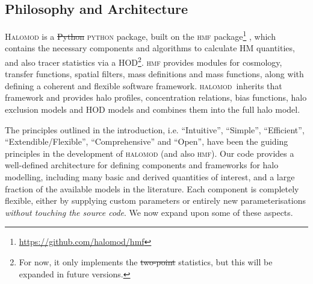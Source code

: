 \documentclass[5p,aas_macros]{elsarticle}
\newcommand{\halomod}{\textsc{halomod}\xspace} %
\newcommand{\python}{\textsc{python}\xspace} %
\newcommand{\bd}[1]{\textcolor{purple}{\textbf{[BD: #1]}}}
\newcommand{\sgm}[1]{\textcolor{green}{\textbf{[SM: #1]}}}
\providecommand{\DIFaddtex}[1]{{\protect\color{blue}\uwave{#1}}} %
\providecommand{\DIFdeltex}[1]{{\protect\color{red}\sout{#1}}}                      %
\providecommand{\DIFaddbegin}{} %
\providecommand{\DIFaddend}{} %
\providecommand{\DIFdelbegin}{} %
\providecommand{\DIFdelend}{} %
\providecommand{\DIFadd}[1]{\texorpdfstring{\DIFaddtex{#1}}{#1}} %
\providecommand{\DIFdel}[1]{\texorpdfstring{\DIFdeltex{#1}}{}} %
\begin{document}
\subsection{Philosophy and Architecture}
\label{sec:halomod:overview}
\textsc{Halomod} is a \DIFdelbegin \DIFdel{Python }\DIFdelend \DIFaddbegin \python \DIFaddend package, built on the \textsc{hmf} package\footnote{\DIFdelbegin %
\DIFdelend \DIFaddbegin \url{https://github.com/halomod/hmf}\DIFaddend } \citep{Murray2013a}, which contains the necessary components and algorithms to calculate HM quantities, and also tracer statistics via a HOD\footnote{For now, it only implements the \DIFdelbegin \DIFdel{two-point }\DIFdelend \DIFaddbegin \DIFadd{2-point }\DIFaddend statistics, but this will be expanded in future versions.}. 
\textsc{hmf} provides modules for cosmology, transfer functions, spatial filters, mass definitions and mass functions, along with defining a coherent and flexible software framework. 
\halomod\ inherits that framework and provides halo profiles, concentration relations, bias functions, halo exclusion models and HOD models and combines them into the full halo model.


\DIFdelbegin %


\DIFdelend The principles outlined in the introduction, i.e.  ``Intuitive'', ``Simple'', ``Efficient'', ``Extendible/Flexible'', ``Comprehensive'' and ``Open'', have been the guiding principles in the development of \textsc{halomod} (and also \textsc{hmf}). Our code provides a well-defined architecture for defining components and frameworks for halo modelling, including many basic and derived quantities of interest, and a large fraction of the available models in the literature. Each component is completely flexible, either by supplying custom parameters or entirely new parameterisations \textit{without touching the source code}. We now expand upon some of these aspects.
\end{document}
